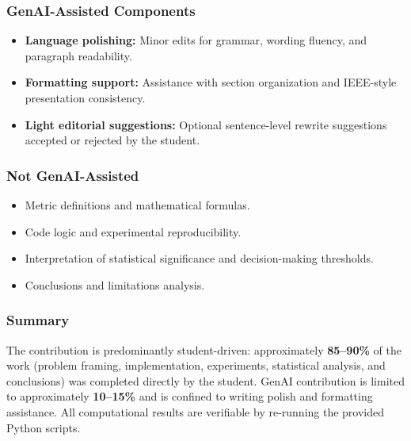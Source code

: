 \documentclass[conference]{IEEEtran}
\begin{document}
\subsubsection*{GenAI-Assisted Components}
\begin{itemize}
\item \textbf{Language polishing:} Minor edits for grammar, wording fluency, and paragraph readability.
\item \textbf{Formatting support:} Assistance with section organization and IEEE-style presentation consistency.
\item \textbf{Light editorial suggestions:} Optional sentence-level rewrite suggestions accepted or rejected by the student.
\end{itemize}

\subsubsection*{Not GenAI-Assisted}
\begin{itemize}
\item Metric definitions and mathematical formulas.
\item Code logic and experimental reproducibility.
\item Interpretation of statistical significance and decision-making thresholds.
\item Conclusions and limitations analysis.
\end{itemize}

\subsubsection*{Summary}
The contribution is predominantly student-driven: approximately \textbf{85--90\%} of the work (problem framing, implementation, experiments, statistical analysis, and conclusions) was completed directly by the student. GenAI contribution is limited to approximately \textbf{10--15\%} and is confined to writing polish and formatting assistance. All computational results are verifiable by re-running the provided Python scripts.



\end{document}
